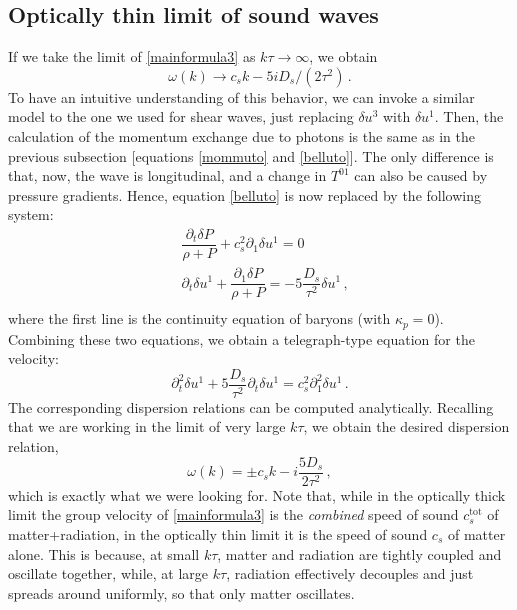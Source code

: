 \documentclass[a4paper, amsfonts, amssymb, amsmath, reprint, showkeys, nofootinbib, twoside,notitlepage,onecolumn]{revtex4-2}
\theoremstyle{definition}
\theoremstyle{theorem}
\theoremstyle{corollary}
\begin{document}
\subsection{Optically thin limit of sound waves}

If we take the limit of \eqref{mainformula3} as $k\tau \rightarrow \infty$, we obtain
\begin{equation}
\omega(k) \longrightarrow c_s k -5 i D_s/(2\tau^2) \, .
\end{equation}
To have an intuitive understanding of this behavior, we can invoke a similar model to the one we used for shear waves, just replacing $\delta u^3$ with $\delta u^1$. Then, the calculation of the momentum exchange due to photons is the same as in the previous subsection [equations \eqref{mommuto} and \eqref{belluto}]. The only difference is that, now, the wave is longitudinal, and a change in $T^{01}$ can also be caused by pressure gradients. Hence, equation \eqref{belluto} is now replaced by the following system:
\begin{equation}\label{bellutowow}
\begin{split}
& \dfrac{\partial_t \delta P}{\rho {+} P} +c_s^2 \partial_1 \delta u^1 =0 \\
& \partial_t \delta u^1+\dfrac{\partial_1 \delta P}{\rho{+}P}=- 5 \dfrac{D_s}{\tau^2} \delta u^1 \, , \\
\end{split}
\end{equation}
where the first line is the continuity equation of baryons (with $\kappa_p =0$). Combining these two equations, we obtain a telegraph-type equation for the velocity:
\begin{equation}
\partial^2_t \delta u^1+5\dfrac{D_s}{\tau^2} \partial_t \delta u^1 =c_s^2 \partial^2_1 \delta u^1 \, .
\end{equation}
The corresponding dispersion relations can be computed analytically. Recalling that we are working in the limit of very large $k\tau$, we obtain the desired dispersion relation,
\begin{equation}
\omega(k)=\pm c_s k -i \dfrac{5D_s}{2\tau^2} \, ,
\end{equation}
which is exactly what we were looking for. Note that, while in the optically thick limit the group velocity of \eqref{mainformula3} is the \textit{combined} speed of sound $c_s^{\text{tot}}$ of matter+radiation, in the optically thin limit it is the speed of sound $c_s$ of matter alone. This is because, at small $k\tau$, matter and radiation are tightly coupled and oscillate together, while, at large $k\tau$, radiation effectively decouples and just spreads around uniformly, so that only matter oscillates.
\end{document}

